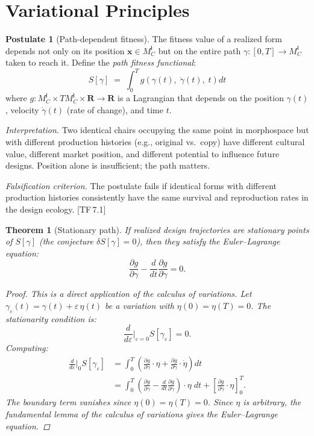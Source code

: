 \documentclass[11pt, a4paper]{article}
\theoremstyle{definition}
\newtheorem{postulate}[definition]{Postulate}
\theoremstyle{plain}
\newtheorem{theorem}[definition]{Theorem}
\theoremstyle{remark}
\newcommand{\MC}{M^{\mathsf{I}}_C}          %
\providecommand{\R}{}
\renewcommand{\R}{\mathbf{R}}               %
\newcommand{\TF}[1]{\textnormal{[TF\,#1]}}  %
\begin{document}
\section{Variational Principles}\label{sec:variational}

\begin{postulate}[Path-dependent fitness]\label{post:9.1}
The fitness value of a realized form depends not only on its position
$\bm{x} \in \MC$ but on the entire path $\gamma : [0, T] \to \MC$
taken to reach it. Define the \emph{path fitness functional}:
\[
  S[\gamma] \;=\; \int_0^T
    g\!\left(\gamma(t),\; \dot{\gamma}(t),\; t\right) dt
\]
where $g : \MC \times T\MC \times \R \to \R$ is a Lagrangian that
depends on the position $\gamma(t)$, velocity $\dot{\gamma}(t)$
(rate of change), and time $t$.

\medskip\noindent
\textit{Interpretation.}\;
Two identical chairs occupying the same point in morphospace but with
different production histories (e.g., original vs.\ copy) have
different cultural value, different market position, and different
potential to influence future designs. Position alone is insufficient;
the path matters.

\medskip\noindent
\textit{Falsification criterion.}\;
The postulate fails if identical forms with different production
histories consistently have the same survival and reproduction rates
in the design ecology. \TF{7.1}
\end{postulate}

\begin{theorem}[Stationary path]\label{thm:9.2}
If realized design trajectories are stationary points of $S[\gamma]$
(the conjecture $\delta S[\gamma] = 0$), then they satisfy the
Euler--Lagrange equation:
\[
  \frac{\partial g}{\partial \gamma}
  - \frac{d}{dt}\frac{\partial g}{\partial \dot{\gamma}} = 0.
\]

\begin{proof}
This is a direct application of the calculus of variations. Let
$\gamma_\varepsilon(t) = \gamma(t) + \varepsilon \, \eta(t)$ be a
variation with $\eta(0) = \eta(T) = 0$. The stationarity condition is:
\[
  \frac{d}{d\varepsilon}\bigg|_{\varepsilon=0} S[\gamma_\varepsilon]
  = 0.
\]
Computing:
\begin{align*}
  \frac{d}{d\varepsilon}\bigg|_{0} S[\gamma_\varepsilon]
  &= \int_0^T \left(
    \frac{\partial g}{\partial \gamma} \cdot \eta
    + \frac{\partial g}{\partial \dot{\gamma}} \cdot \dot{\eta}
  \right) dt \\
  &= \int_0^T \left(
    \frac{\partial g}{\partial \gamma}
    - \frac{d}{dt}\frac{\partial g}{\partial \dot{\gamma}}
  \right) \cdot \eta \; dt
  + \left[\frac{\partial g}{\partial \dot{\gamma}} \cdot \eta
  \right]_0^T.
\end{align*}
The boundary term vanishes since $\eta(0) = \eta(T) = 0$. Since $\eta$
is arbitrary, the fundamental lemma of the calculus of variations
gives the Euler--Lagrange equation. \qedhere
\end{proof}
\end{theorem}
\end{document}
